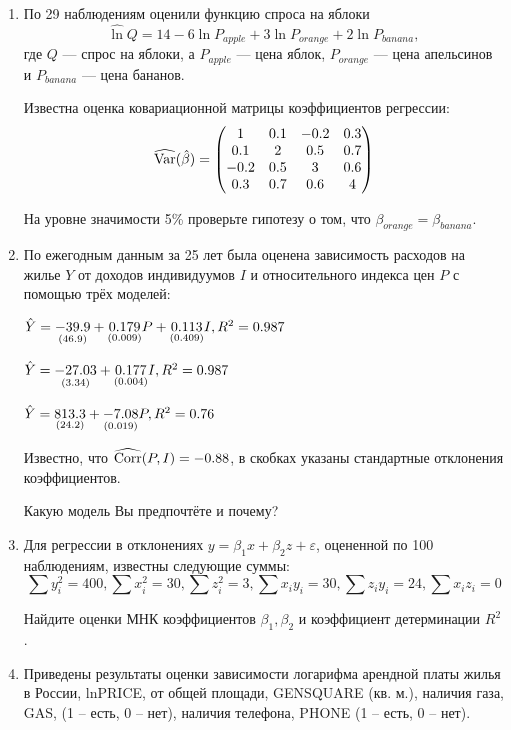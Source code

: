 \begin{enumerate}

\item По 29 наблюдениям оценили функцию спроса на яблоки
\[
\widehat\ln Q = 14 -6 \ln P_{apple} + 3 \ln P_{orange} + 2 \ln P_{banana},
\]
где $Q$ — спрос на яблоки, а $P_{apple}$ — цена яблок, $P_{orange}$ — цена апельсинов и $P_{banana}$ — цена бананов.

Известна оценка ковариационной матрицы коэффициентов регрессии:
\[
\widehat{\operatorname{Var}}(\hat{\beta}) =
\begin{pmatrix}
1 & 0.1 & -0.2 & 0.3 \\
0.1 & 2 & 0.5 & 0.7 \\
-0.2 & 0.5 & 3 & 0.6 \\
0.3 & 0.7 & 0.6 &  4
\end{pmatrix}
\]

На уровне значимости 5\% проверьте гипотезу о том, что
$\beta_{orange}=\beta_{banana}$.


\item По ежегодным данным за 25 лет была оценена зависимость расходов на жилье $Y$ от доходов индивидуумов $I$ и относительного индекса цен $P$ с помощью трёх моделей:

$\hat{Y} = \underset{(46.9)}{-39.9} + \underset{(0.009)}{0.179} P + \underset{(0.409)}{0.113} I, R^2 = 0.987$

$\hat{Y} = \underset{(3.34)}{-27.03} + \underset{(0.004)}{0.177} I, R^2 = 0.987$

$\hat{Y} = \underset{(24.2)}{813.3} + \underset{(0.019)}{-7.08} P, R^2 = 0.76$

Известно, что $\widehat{\operatorname{Corr}} (P, I) = -0.88$, в скобках указаны стандартные отклонения коэффициентов.

Какую модель Вы предпочтёте и почему?


\item Для регрессии в отклонениях $y = \beta_1 x + \beta_2 z + \varepsilon$, оцененной по 100 наблюдениям, известны следующие суммы:
\[
\sum y^2_i = 400, \sum x_i^2 = 30, \sum z_i^2 = 3, \sum x_i y_i = 30, \sum z_i y_i = 24, \sum x_i z_i = 0
\]

Найдите оценки МНК коэффициентов $\beta_1, \beta_2$ и коэффициент детерминации $R^2$.


\item Приведены результаты оценки зависимости логарифма арендной платы жилья в России, lnPRICE, от общей площади,  GENSQUARE (кв. м.), наличия газа, GAS, (1 – есть, 0 – нет), наличия телефона, PHONE (1 – есть, 0 – нет).


\end{enumerate}
